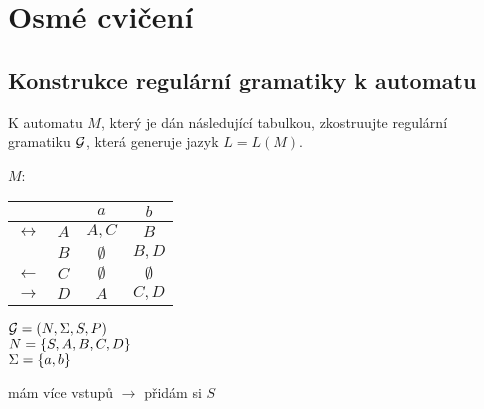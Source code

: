 \section{Osmé cvičení}

\subsection{Konstrukce regulární gramatiky k automatu}
K automatu $M$, který je dán následující tabulkou, zkostruujte regulární gramatiku $\mathcal{G}$, která generuje jazyk
$L = L(M)$.

$M$: \hspace{2mm}
\begin{multicols}{2}

    \begin{tabular}{|r c|c c|}
        \hline
        & & $a$ & $b$ \\
        \hline
        \hline
        $\leftrightarrow$&$ A$ & $A,C$ & $B$ \\
        \hline
        &$ B$ & $\emptyset$ & $B, D$ \\
        \hline
        $\leftarrow$ &$ C$ & $\emptyset$ & $\emptyset$ \\
        \hline
        $\rightarrow$&$D$ & $A$ & $C,D$ \\
        \hline
    \end{tabular}

    \vspace*{5mm}
    $\mathcal{G} = (N, \Sigma, S, P)$ \\
    $ N = \left\lbrace S, A, B, C, D \right\rbrace$\\
    $\Sigma = \left\lbrace a, b \right\rbrace$

\columnbreak
    mám více vstupů $\rightarrow$ přidám si $S$

\end{multicols}
